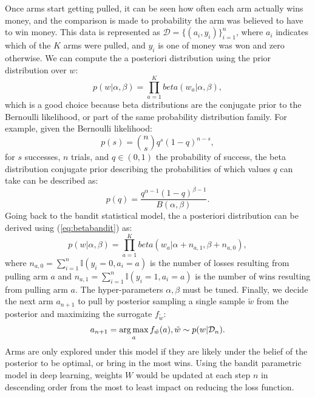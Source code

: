Once arms start getting pulled, it can be seen how often each arm actually wins money, and the comparison is made to probability the arm was believed to have to win money. This data is represented as $\mathcal{D} = \{(a_i,y_i)\}_{i=1}^n$, where $a_i$ indicates which of the $K$ arms were pulled, and $y_i$ is one of money was won and zero otherwise. We can compute the a posteriori distribution using the prior distribution over $w$:
\begin{equation}
\label{eq:betabandit}
p(w | \alpha, \beta) = \prod_{a=1}^{K} beta(w_a | \alpha,\beta),
\end{equation}
which is a good choice because beta distributions are the conjugate prior to the Bernoulli likelihood, or part of the same probability distribution family. For example, given the Bernoulli likelihood:
\begin{equation}
\label{eq:bernoulliex}
p(s) = {n\choose s}q^s(1-q)^{n-s},
\end{equation}
for $s$ successes, $n$ trials, and $q \in (0,1)$ the probability of success, the beta distribution conjugate prior describing the probabilities of which values $q$ can take can be described as:
\begin{equation}
\label{eq:betaex}
p(q) = \frac{q^{\alpha -1}(1-q)^{\beta -1}}{B(\alpha, \beta)}.
\end{equation}
Going back to the bandit statistical model, the a posteriori distribution can be derived using (\ref{eq:betabandit}) as:
\begin{equation}
\label{eq:posteriori}
p(w | \alpha, \beta) = \prod_{a=1}^{K} beta(w_a | \alpha+n_{a,1},\beta+n_{a,0}),
\end{equation}
where $n_{a,0} = \sum_{i=1}^n \mathbb{I}(y_i=0,a_i=a)$ is the number of losses resulting from pulling arm $a$ and $n_{a,1} = \sum_{i=1}^n \mathbb{I}(y_i=1,a_i=a)$ is the number of wins resulting from pulling arm $a$. The hyper-parameters $\alpha, \beta$ must be tuned. Finally, we decide the next arm $a_{n+1}$ to pull by posterior sampling a single sample $\tilde{w}$ from the posterior and maximizing the surrogate $f_{\tilde{w}}$:
\begin{equation}
\label{eq:picknextarm}
a_{n+1} = \operatorname*{arg\,max}_a f_{\tilde{w}} (a), \tilde{w} \sim p(w|\mathcal{D}_n).
\end{equation}
Arms are only explored under this model if they are likely under the belief of the posterior to be optimal, or bring in the most wins. Using the bandit parametric model in deep learning, weights $W$ would be updated at each step $n$ in descending order from the most to least impact on reducing the loss function.

